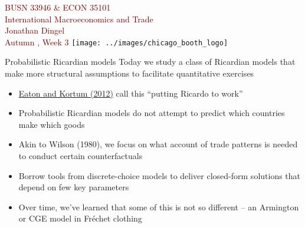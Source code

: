 \documentclass[10pt,notes=hide]{beamer}
\begin{document}
\begin{frame}[plain]
\begin{center}
\large
\textcolor{maroon}{BUSN 33946 \& ECON 35101\\
International Macroeconomics and Trade\\ 
Jonathan Dingel\\
Autumn \the\year, Week 3}
\vfill 
\texttt{[image: ../images/chicago\_booth\_logo]}
\end{center}
\end{frame}
\begin{frame}{Probabilistic Ricardian models}
Today we study a class of Ricardian models that make more structural assumptions to facilitate quantitative exercises
\begin{itemize}
	\item \href{https://www.aeaweb.org/articles?id=10.1257/jep.26.2.65}{Eaton and Kortum (2012)} call this ``putting Ricardo to work''
	\item Probabilistic Ricardian models do not attempt to predict which countries make which goods
	\item Akin to Wilson (1980), we focus on what account of trade patterns is needed to conduct certain counterfactuals
	\item Borrow tools from discrete-choice models to deliver closed-form solutions that depend on few key parameters
	\item Over time, we've learned that some of this is not so different -- an Armington or CGE model in Fr\'{e}chet clothing
\end{itemize}
\end{frame}
\end{document}
